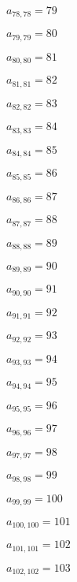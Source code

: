 \documentclass[a4paper,12pt]{article}
\begin{document}
$a _{ 78, 78 } = 79$

$a _{ 79, 79 } = 80$

$a _{ 80, 80 } = 81$

$a _{ 81, 81 } = 82$

$a _{ 82, 82 } = 83$

$a _{ 83, 83 } = 84$

$a _{ 84, 84 } = 85$

$a _{ 85, 85 } = 86$

$a _{ 86, 86 } = 87$

$a _{ 87, 87 } = 88$

$a _{ 88, 88 } = 89$

$a _{ 89, 89 } = 90$

$a _{ 90, 90 } = 91$

$a _{ 91, 91 } = 92$

$a _{ 92, 92 } = 93$

$a _{ 93, 93 } = 94$

$a _{ 94, 94 } = 95$

$a _{ 95, 95 } = 96$

$a _{ 96, 96 } = 97$

$a _{ 97, 97 } = 98$

$a _{ 98, 98 } = 99$

$a _{ 99, 99 } = 100$

$a _{ 100, 100 } = 101$

$a _{ 101, 101 } = 102$

$a _{ 102, 102 } = 103$
\end{document}
